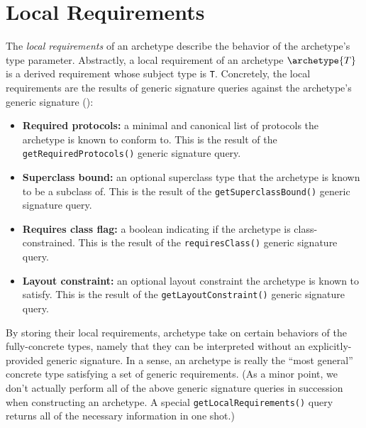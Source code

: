 \documentclass[../generics]{subfiles}
\begin{document}
\section{Local Requirements}\label{local requirements}

The \emph{local requirements} of an archetype describe the behavior of the archetype's type parameter. Abstractly, a local requirement of an archetype $\archetype{T}$ is a derived requirement whose subject type is \texttt{T}. Concretely, the local requirements are the results of generic signature queries against the archetype's generic signature ():
\begin{itemize}
\item \textbf{Required protocols:} a minimal and canonical list of protocols the archetype is known to conform to. This is the result of the \texttt{getRequiredProtocols()} generic signature query.
\item \textbf{Superclass bound:} an optional superclass type that the archetype is known to be a subclass of. This is the result of the \texttt{getSuperclassBound()} generic signature query.
\item \textbf{Requires class flag:} a boolean indicating if the archetype is class-constrained. This is the result of the \texttt{requiresClass()} generic signature query.
\item \textbf{Layout constraint:} an optional layout constraint the archetype is known to satisfy. This is the result of the \texttt{getLayoutConstraint()} generic signature query.
\end{itemize}
By storing their local requirements, archetype take on certain behaviors of the fully-concrete types, namely that they can be interpreted without an explicitly-provided generic signature. In a sense, an archetype is really the ``most general'' concrete type satisfying a set of generic requirements. (As a minor point, we don't actually perform all of the above generic signature queries in succession when constructing an archetype. A special \texttt{getLocalRequirements()} query returns all of the necessary information in one shot.)
\end{document}
